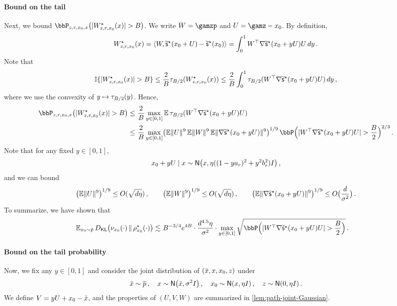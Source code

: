 \paragraph{Bound on the tail}
Next, we bound $\bbP_{z,r,\xz,x}\prn*{\abs{\epsxz}>\B}$.
We write $W=\gamzp$ and $U=\gamz-\xz$. By definition,
\begin{align*}
    \epsxz=\tri{W, \tscfs(\xz+U)-\tscfs(\xz)}=\int_{0}^1 W\tp \nabla \tscfs(\xz+yU) U\, dy\,.
\end{align*}
Note that 
\begin{align*}
    \indic\crl{\abs{\epsxz}>\B}
    \leq \frac{2}{\B}\trunc[\B/2]{\epsxz}
    \leq \frac{2}{\B}\int_{0}^1 \trunc[\B/2]{W\tp \nabla \tscfs(\xz+yU) U}\, dy\,,
\end{align*}
where we use the convexity of $y\mapsto \trunc[\B/2]{y}$. Hence,
\begin{align*}
    \bbP_{z,r,\xz,x}\prn*{\abs{\epsxz}>\B}
    \leq&~ \frac{2}{\B}\max_{y\in[0,1]} \En\trunc[\B/2]{W\tp \nabla \tscfs(\xz+yU) U} \\
    \leq&~ \frac{2}{\B} \max_{y\in[0,1]} \prn*{ \En\nrm{U}^9\En\nrm{W}^9\En\nrm{\nabla \tscfs(\xz+yU)}^9 }^{1/9} \, \bbP\prn[\Big]{\abs{W\tp \nabla \tscfs(\xz+yU) U}>\frac{\B}{2}} ^{2/3}\,.
\end{align*}
Note that for any fixed $y\in[0,1]$, 
\begin{align*}
    \xz+yU\mid x\sim \normal{x,\eta ((1-y\alr)^2+y^2\blr^2)\Id}\,, 
\end{align*}
and we can bound
\begin{align*}
    \prn*{\En\nrm{U}^9}^{1/9}\leq O(\sqrt{d\eta})\,, \qquad 
    \prn*{\En\nrm{W}^9}^{1/9}\leq O(\sqrt{d\eta})\,, \qquad
    \prn*{\En\nrm{\nabla \tscfs(\xz+yU)}^9}^{1/9}\leq O\prn[\big]{\frac{d}{\sigma^2}}\,.
\end{align*}
To summarize, we have shown that
\begin{align*}
    \En_{\xz\sim \breve p} \Dkl{\piz{\cdot}}{\rhosz{\cdot}}
    \leqsim&~ B^{-3/4}e^{4B}\cdot \frac{d^{4.5}\eta}{\sigma^2}\cdot \max_{y\in[0,1]} \sqrt{\bbP\prn[\Big]{\abs{W\tp \nabla \tscfs(\xz+yU) U}>\frac{\B}{2}} }\,. 
\end{align*}

\paragraph{Bound on the tail probability}
Now, we fix any $y\in[0,1]$ and consider the joint distribution of $(\xbar,x,\xz,z)$ under
\begin{align*}
    \xbar\sim \pbar\,, \quad
    x\sim \normal{\xbar,\sigma^2\Id}\,, \quad
    \xz\sim \normal{x,\eta\Id}\,, \quad
    z\sim \Neta\,.
\end{align*}
We define $V=yU+\xz-\xbar$, and the properties of $(U,V,W)$ are summarized in \cref{lem:path-joint-Gaussian}. 

